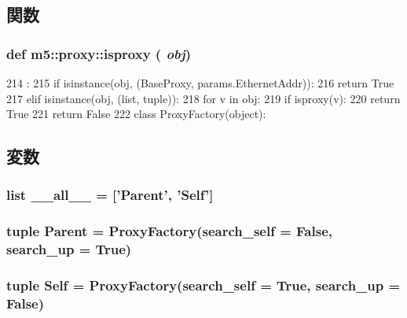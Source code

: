 \subsection{関数}
\hypertarget{namespacem5_1_1proxy_aa1486288b33bd09a0b79388e44c74d63}{
\subsubsection[{isproxy}]{\setlength{\rightskip}{0pt plus 5cm}def m5::proxy::isproxy ( {\em obj})}}
\label{namespacem5_1_1proxy_aa1486288b33bd09a0b79388e44c74d63}



\begin{DoxyCode}
214                 :
215     if isinstance(obj, (BaseProxy, params.EthernetAddr)):
216         return True
217     elif isinstance(obj, (list, tuple)):
218         for v in obj:
219             if isproxy(v):
220                 return True
221     return False
222 
class ProxyFactory(object):
\end{DoxyCode}


\subsection{変数}
\hypertarget{namespacem5_1_1proxy_aa4a022e6ddacd362b83964da5cc5d044}{
\subsubsection[{\_\-\_\-all\_\-\_\-}]{\setlength{\rightskip}{0pt plus 5cm}list {\bf \_\-\_\-all\_\-\_\-} = \mbox{[}'{\bf Parent}', '{\bf Self}'\mbox{]}}}
\label{namespacem5_1_1proxy_aa4a022e6ddacd362b83964da5cc5d044}
\hypertarget{namespacem5_1_1proxy_ad1553f66f41fc2322bd24baa73f22989}{
\subsubsection[{Parent}]{\setlength{\rightskip}{0pt plus 5cm}tuple {\bf Parent} = {\bf ProxyFactory}(search\_\-self = False, search\_\-up = True)}}
\label{namespacem5_1_1proxy_ad1553f66f41fc2322bd24baa73f22989}
\hypertarget{namespacem5_1_1proxy_ac97d41c251a0e0685534d109e66e63d5}{
\subsubsection[{Self}]{\setlength{\rightskip}{0pt plus 5cm}tuple {\bf Self} = {\bf ProxyFactory}(search\_\-self = True, search\_\-up = False)}}
\label{namespacem5_1_1proxy_ac97d41c251a0e0685534d109e66e63d5}
